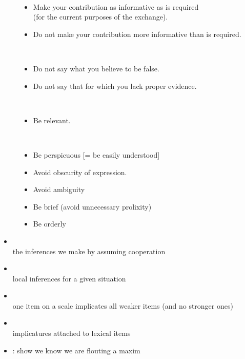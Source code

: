 \documentclass[headrule,footrule]{foils}
\begin{document}
\begin{small}
\begin{description}
\item [] ~
  \begin{itemize}
  \item Make your contribution as informative as is required
    \\ (for the current purposes of the exchange).
  \item Do not make your contribution more informative than is required.
  \end{itemize}
\item [] ~
  \begin{itemize}
  \item Do not say what you believe to be false.
  \item Do not say that for which you lack proper evidence.
  \end{itemize}
\item [] ~
  \begin{itemize}
  \item Be relevant.
  \end{itemize}
\item [] ~
  \begin{itemize}
  \item Be perspicuous [= be easily understood]
  \item Avoid obscurity of expression.
  \item Avoid ambiguity
  \item Be brief (avoid unnecessary prolixity)
  \item Be orderly
  \end{itemize}
\end{description}
\end{small}

\begin{itemize}
\item {}
\\ the inferences we make by assuming cooperation
\item {}
\\ local inferences for a given situation
\item {}
\\ one item on  a scale implicates all weaker items (and no stronger ones)
\item {}
\\ implicatures attached to lexical items
\item {}: show we know we are flouting a maxim
\end{itemize}
\end{document}
